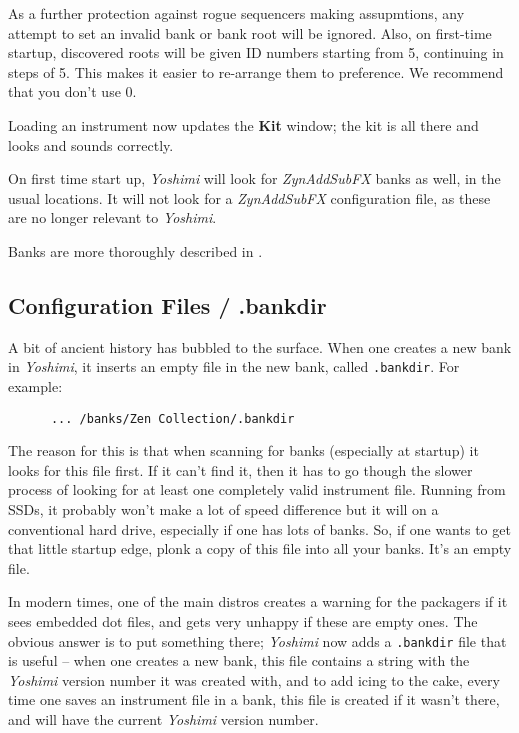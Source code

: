    As a further protection against rogue sequencers making assupmtions, any
   attempt to set an invalid bank or bank root will be ignored.  Also, on
   first-time startup, discovered roots will be given ID numbers starting from 5,
   continuing in steps of 5. This makes it easier to re-arrange them to
   preference. We recommend that you don't use 0.

   Loading an instrument now updates the \textbf{Kit} window;
   the kit is all there and looks and sounds correctly.

   On first time start up, \textsl{Yoshimi}
   will look for \textsl{ZynAddSubFX} banks as well, in the usual locations.
   It will not look for a \textsl{ZynAddSubFX} configuration file, as these
   are no longer relevant to \textsl{Yoshimi}.
  
   Banks are more thoroughly described in
   .

\subsection{Configuration Files / .bankdir}
\label{subsec:configuration_bankdir}

   A bit of ancient history has bubbled to the surface.
   When one creates a new bank in \textsl{Yoshimi}, it inserts an empty file in
   the new bank, called \texttt{.bankdir}.  For example:

   \begin{verbatim}
      ... /banks/Zen Collection/.bankdir
   \end{verbatim}

   The reason for this is that when scanning for banks (especially at startup) it
   looks for this file first. If it can't find it, then it has to go though the
   slower process of looking for at least one completely valid instrument file.
   Running from SSDs, it probably won't make a lot of speed difference but it
   will on a conventional hard drive, especially if one has lots of banks.  So,
   if one wants to get that little startup edge, plonk a copy of this file into
      all your banks.  It's an empty file.

   In modern times, one of the main distros creates a warning for the packagers
   if it sees embedded dot files, and gets very unhappy if these are empty ones.
   The obvious answer is to put something there; \textsl{Yoshimi} now adds a
   \texttt{.bankdir} file that is useful -- when one creates a new bank, this
   file contains a string with the \textsl{Yoshimi} version number it was
   created with, and to add icing to the cake, every time one saves an
   instrument file in a bank, this file is created if it wasn't there, and
   will have the current \textsl{Yoshimi} version number.

